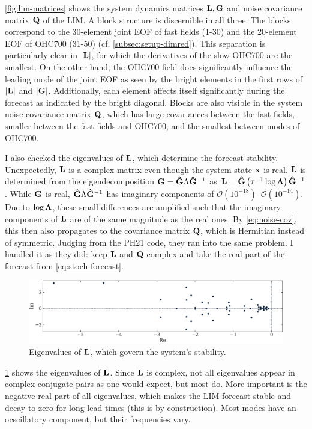 \documentclass[parskip=half,DIV=16]{scrartcl}
\begin{document}
\cref{fig:lim-matrices} shows the system dynamics matrices $\vb{L}, \vb{G}$ and noise covariance matrix $\vb{Q}$ of the LIM. A block structure is discernible in all three. The blocks correspond to the 30-element joint EOF of fast fields (1-30) and the 20-element EOF of OHC700 (31-50) (cf. \cref{subsec:setup-dimred}). This separation is particularly clear in $|\vb{L}|$, for which the derivatives of the slow OHC700 are the smallest. On the other hand, the OHC700 field does significantly influence the leading mode of the joint EOF as seen by the bright elements in the first rows of $|\vb{L}|$ and $|\vb{G}|$. Additionally, each element affects itself significantly during the forecast as indicated by the bright diagonal. Blocks are also visible in the system noise covariance matrix $\vb{Q}$, which has large covariances between the fast fields, smaller between the fast fields and OHC700, and the smallest between modes of OHC700.

I also checked the eigenvalues of $\vb{L}$, which determine the forecast stability. Unexpectedly, $\vb{L}$ is a complex matrix even though the system state $\vb{x}$ is real. $\vb{L}$ is determined from the eigendecomposition $\vb{G} = \vu{G} \Lambda\vu{G}^{-1}$ as $\vb{L} = \vu{G} \left(\tau^{-1}\log\vb{\Lambda}\right)\vu{G}^{-1}$. While $\vb{G}$ is real, $\vu{G} \Lambda\vu{G}^{-1}$ has imaginary components of $\mathcal{O}(10^{-18})$--$\mathcal{O}(10^{-14})$. Due to $\log\vb{\Lambda}$, these small differences are amplified such that the imaginary components of $\vb{L}$ are of the same magnitude as the real ones. By \cref{eq:noise-cov}, this then also propagates to the covariance matrix $\vb{Q}$, which is Hermitian instead of symmetric. Judging from the PH21 code, they ran into the same problem. I handled it as they did: keep $\vb{L}$ and $\vb{Q}$ complex and take the real part of the forecast from \cref{eq:stoch-forecast}.

\begin{figure}[h]
    \centering
    \includegraphics{figures/plots/lim_eigs.pdf}
    \caption{Eigenvalues of $\vb{L}$, which govern the system's stability.}
    \label{fig:lim-eigs}
\end{figure}
\cref{fig:lim-eigs} shows the eigenvalues of $\vb{L}$. Since $\vb{L}$ is complex, not all eigenvalues appear in complex conjugate pairs as one would expect, but most do. More important is the negative real part of all eigenvalues, which makes the LIM forecast stable and decay to zero for long lead times (this is by construction). Most modes have an ocscillatory component, but their frequencies vary.
\end{document}
